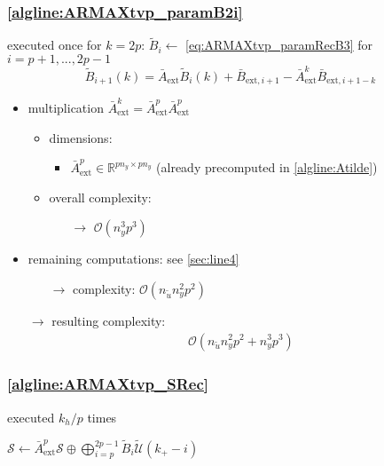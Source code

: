 \documentclass{article}
\begin{document}
\subsubsection{\cref{algline:ARMAXtvp_paramB2i}} \label{sec:line11}
executed once for $k=2p$:
$\tilde{B}_i \gets$ \cref{eq:ARMAXtvp_paramRecB3}{ \small for $i=p+1,...,2p-1$}
$$\tilde{B}_{i+1}(k) = \bar{A}_\text{ext}\tilde{B}_{i}(k) + \bar{B}_{\text{ext},i+1} - \bar{A}_\text{ext}^{k}\bar{B}_{\text{ext},i+1-k}$$
\begin{itemize}
    \item multiplication $\bar{A}_\text{ext}^{k}=\bar{A}_\text{ext}^{p}\bar{A}_\text{ext}^{p}$
    \begin{itemize}
        \item dimensions:
        \begin{itemize}
            \item $\bar{A}_\text{ext}^p \in \mathbb{R}^{pn_y \times pn_y}$ (already precomputed in \cref{algline:Atilde}) 
        \end{itemize}
        \item overall complexity:
        \begin{itemize}
            \item[$\rightarrow$] $\mathcal{O}(n_y^3 p^3)$
        \end{itemize} 
    \end{itemize}
    \item remaining computations: see \cref{sec:line4}
        \begin{itemize}
            \item[$\rightarrow$] complexity: $\mathcal{O}(n_{\tilde{u}} n_y^2 p^2)$
        \end{itemize} 
    \item[$\rightarrow$] resulting complexity: \begin{align*}
        \mathcal{O}(n_{\tilde{u}} n_y^2 p^2 + n_y^3 p^3)
    \end{align*}
\end{itemize}

\subsubsection{\cref{algline:ARMAXtvp_SRec}} \label{sec:line13}
executed $k_h/p$ times

${\mathcal{S}} \gets \bar{A}_\text{ext}^{p} {\mathcal{S}}  \oplus \bigoplus_{i=p}^{2p-1} \tilde{B}_{i} \tilde{\mathcal{U}}(k_+-i)$  
\end{document}
